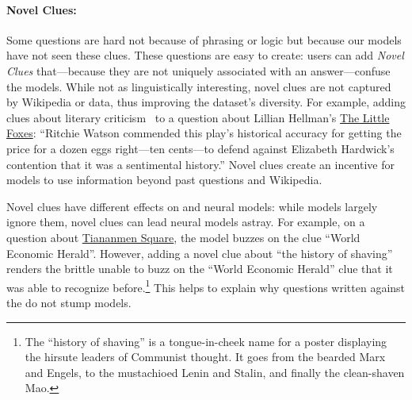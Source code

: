 \paragraph{Novel Clues:} Some \challenge{} questions are hard
not because of phrasing or logic but because our models have
not seen these clues.  These questions are easy
to create: users can add \emph{Novel Clues} that---because they are
not uniquely associated with an answer---confuse the models.
While not as linguistically interesting, novel clues are
not captured by Wikipedia or \qb{} data, thus improving the
dataset's diversity.  For example, adding clues about literary
criticism~\cite{hardwick-67,watson-96} to a question about Lillian
Hellman's \underline{The Little Foxes}: ``Ritchie Watson commended
this play's historical accuracy for getting the price for a dozen eggs
right---ten cents---to defend against Elizabeth Hardwick's contention
that it was a sentimental history.'' Novel clues create 
an incentive for models to use
information beyond past questions and Wikipedia.

Novel clues have different effects on  and neural models:
while  models largely ignore them, novel clues can lead
neural models astray.  For example, on a question about \underline{Tiananmen
Square}, the  model buzzes on
the clue ``World Economic Herald''.  However, adding a novel clue
about ``the history of shaving''
renders the brittle  unable to buzz on the ``World Economic
Herald'' clue that it was able to recognize before.\footnote{The ``history of shaving'' is a tongue-in-cheek name for a poster
displaying the hirsute leaders of Communist thought. It goes from the bearded Marx and Engels,
to the mustachioed Lenin and Stalin, and finally the clean-shaven Mao.}  This helps
to explain why \challenge{} questions written against the 
do not stump  models.